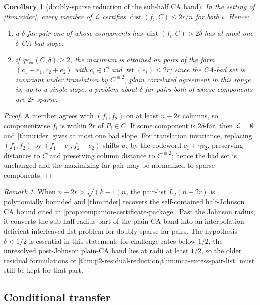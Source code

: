\documentclass[11pt]{amsart}
\newtheorem{corollary}[corollary]{Corollary}
\theoremstyle{definition}
\theoremstyle{remark}
\newtheorem{remark}[remark]{Remark}
\newcommand{\dist}{\operatorname{dist}}
\newcommand{\wt}{\operatorname{wt}}
\newcommand{\eca}{\varepsilon_{\mathrm{ca}}}
\begin{document}
\begin{corollary}[doubly-sparse reduction of the sub-half CA band]\label{cor:doubly}
In the setting of \cref{thm:rider}, every member of $\mathcal L$ certifies $\dist(f_i,C)\le2r/n$ for both $i$.  Hence:
\begin{enumerate}
\item a $\delta$-far pair one of whose components has $\dist(f_i,C)>2\delta$ has at most one $\delta$-CA-bad slope;
\item if $q\eca(C,\delta)\ge2$, the maximum is attained on pairs of the form $(c_1+e_1,c_2+e_2)$ with $c_i\in C$ and $\wt(e_i)\le2r$; since the CA-bad set is invariant under translation by $C^{\equiv2}$, plain correlated agreement in this range is, up to a single slope, a problem about $\delta$-far pairs both of whose components are $2r$-sparse.
\end{enumerate}
\end{corollary}

\begin{proof}
A member agrees with $(f_1,f_2)$ on at least $n-2r$ columns, so componentwise $f_i$ is within $2r$ of $P_i\in C$.  If some component is $2\delta$-far, then $\mathcal L=\emptyset$ and \cref{thm:rider} gives at most one bad slope.  For translation invariance, replacing $(f_1,f_2)$ by $(f_1-c_1,f_2-c_2)$ shifts $u_\gamma$ by the codeword $c_1+\gamma c_2$, preserving distances to $C$ and preserving column distance to $C^{\equiv2}$; hence the bad set is unchanged and the maximizing far pair may be normalized to sparse components.
\end{proof}

\begin{remark}\label{rem:rider-context}
When $n-2r>\sqrt{(k-1)n}$, the pair-list $L_2(n-2r)$ is polynomially bounded and \cref{thm:rider} recovers the self-contained half-Johnson CA bound cited in \cref{prop:companion-certificate-package}.  Past the Johnson radius, it converts the sub-half-radius part of the plain-CA band into an interpolation-deficient interleaved list problem for doubly sparse far pairs.  The hypothesis $\delta<1/2$ is essential in this statement; for challenge rates below $1/2$, the unresolved post-Johnson plain-CA band lies at radii at least $1/2$, so the older residual formulations of \cref{thm:p2-residual-reduction,thm:mca-excess-pair-list} must still be kept for that part.
\end{remark}

\subsection{Conditional transfer}
\end{document}
